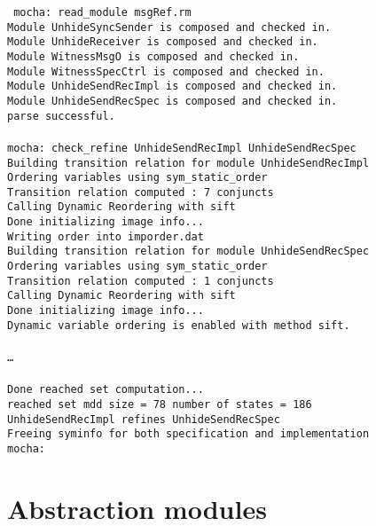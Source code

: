 \mypar
{\tt
mocha: read\_module msgRef.rm \\
Module UnhideSyncSender is composed and checked in.\\
Module UnhideReceiver is composed and checked in.\\
Module WitnessMsgO is composed and checked in.\\
Module WitnessSpecCtrl is composed and checked in.\\
Module UnhideSendRecImpl is composed and checked in.\\
Module UnhideSendRecSpec is composed and checked in.\\
parse successful.\\
\\
mocha: check\_refine UnhideSendRecImpl UnhideSendRecSpec\\
Building transition relation for module UnhideSendRecImpl\\
Ordering variables using sym\_static\_order\\
Transition relation computed : 7 conjuncts\\
Calling Dynamic Reordering with sift\\
Done initializing image info...\\
Writing order into imporder.dat\\
Building transition relation for module UnhideSendRecSpec\\
Ordering variables using sym\_static\_order\\
Transition relation computed : 1 conjuncts\\
Calling Dynamic Reordering with sift\\
Done initializing image info...\\
Dynamic variable ordering is enabled with method sift.\\
\\
\ldots\\
\\
Done reached set computation...\\
reached set mdd size =         78        number of states =      186\\
UnhideSendRecImpl refines UnhideSendRecSpec\\
Freeing syminfo for both specification and implementation\\
mocha: 
}

\section{Abstraction modules}
\label{sec:abstraction_modules}

